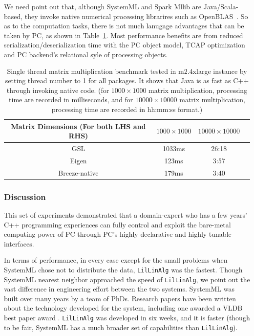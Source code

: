 We need point out that, although SystemML and Spark Mllib are
Java/Scala-based, they invoke native
numerical processing librarires such as OpenBLAS~\cite{OpenBLAS}. So as to
the computation tasks, there is not much lanugage advantages that can
be taken by PC, as shown in Table~\ref{fig:matrixMult}. 
Most performance benefits are from reduced
serialization/deserialization time with the PC object model, TCAP optimization and PC
backend's relational syle of processing objects.

\begin{table}[h!]
\begin{center}
\begin{tabular}{|c||c|c|c||}
\hline
Matrix Dimensions (For both LHS and RHS) & $1000\times1000$ & $10000\times10000$ \\
\hline
\hline
GSL &1033ms &26:18  \\
Eigen &123ms  &3:57\\
Breeze-native &179ms  &3:40\\
\hline
\end{tabular}
\caption{Single thread matrix multiplication benchmark tested in
  m2.4xlarge instance by setting thread number  to 1 for all
  packages. It shows that
  Java is as fast as C++ through invoking native code. (for
  $1000\times1000$ matrix multiplication, processing time are recorded in
  milliseconds, and for $10000\times10000$ matrix multiplication, processing time are
  recorded in hh:mm:ss format.)}
\label{fig:matrixMult}
\end{center}
\end{table}

\subsubsection {Discussion}
This set of experiments demonstrated that a
domain-expert who has a few years' C++ programming experiences can fully control and
exploit the bare-metal computing power of PC through PC's highly
declarative and highly tunable interfaces.

In terms of performance, in every case except for the small problems when SystemML chose not to distribute the data,
\texttt{LilLinAlg} was the fastest.  
Though SystemML nearest neighbor approached the speed of 
\texttt{LilLinAlg}, we point out the vast difference in engineering effort between the two systems.  
SystemML was built over many years by a team of PhDs. Research papers have been written about the
technology developed for the system, including one awarded a VLDB best paper award \cite{boehm2016systemml}.
\texttt{LilLinAlg} was developed in six weeks, and it is faster (though to be fair, SystemML has a much broader
set of capabilities than \texttt{LilLinAlg}).

